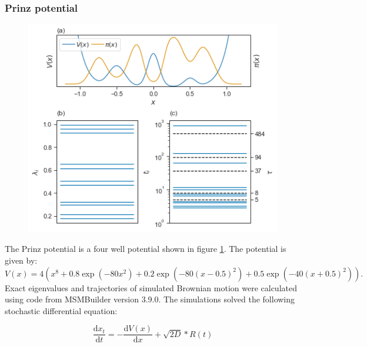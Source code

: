 \subsubsection{Prinz potential}
\begin{figure}
    \centering
    \includegraphics[height=0.4\textheight]{chapters/hmm_selection/figures/prinz_pot.png}
    \label{fig:prinz}
\end{figure}

The Prinz potential \cite{prinzMarkovModelsMolecular2011} is a four well potential shown in figure \ref{fig:prinz}. The potential is given by: 
\begin{equation}\label{eqn:prinz_pot}
       V(x) = 4\left(x^8 + 0.8 \exp{\left(-80 x^2\right)} + 0.2 \exp{\left(-80 (x-0.5)^2\right)} + 0.5\exp{\left(-40 (x+0.5)^2\right)}\right).
\end{equation}
Exact eigenvalues and trajectories of simulated Brownian motion were calculated using code from MSMBuilder \cite{beauchampMSMBuilder2ModelingConformational2011} version 3.9.0.  The simulations solved the following stochastic differential equation: 

\begin{equation}\label{eqn:prinz_dynamics}
    \frac{\mathrm{d}x_t}{\mathrm{d}t} = -\frac{\mathrm{d}V(x)}{\mathrm{d}x} + \sqrt{2D} * R(t)
\end{equation}

